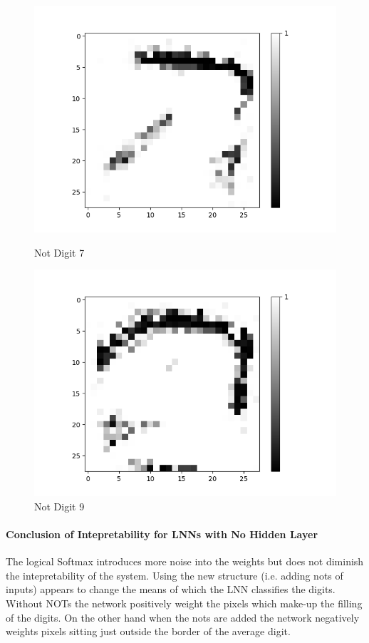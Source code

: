 \begin{figure}[H]
\begin{minipage}[b]{0.19\textwidth}
		\includegraphics[width=\textwidth]{AND(NO-LSM)/Negative/Layer0-Neuron-7.png}
		\caption{Not Digit 7}
		\label{fig:cnf-descrete-generalizatiion}
	\end{minipage}
	\begin{minipage}[b]{0.19\textwidth}
		\captionsetup{labelformat=empty}
		\includegraphics[width=\textwidth]{AND(NO-LSM)/Negative/Layer0-Neuron-9.png}
		\caption{Not Digit 9}
		\label{fig:cnf-descrete-generalizatiion}
	\end{minipage}
	\hfill
\end{figure}

\paragraph{Conclusion of Intepretability for LNNs with No Hidden Layer}
The logical Softmax introduces more noise into the weights but does not diminish the intepretability of the system. Using the new structure (i.e. adding nots of inputs) appears to change the means of which the LNN classifies the digits. Without NOTs the network positively weight the pixels which make-up the filling of the digits. On the other hand when the nots are added the network negatively weights pixels sitting just outside the border of the average digit.\\


